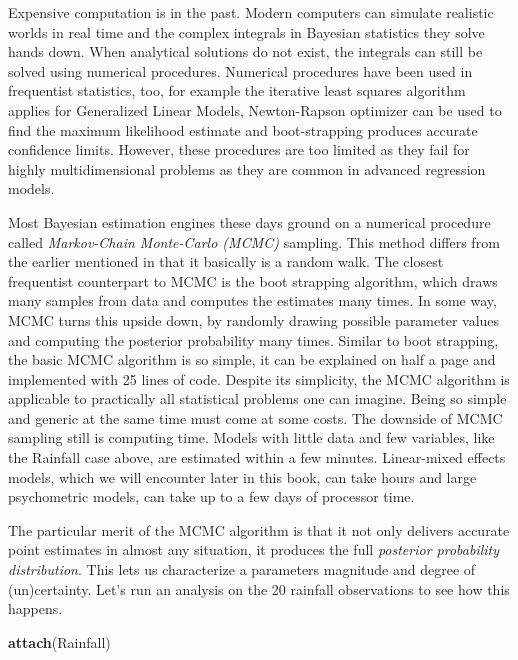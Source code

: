 \documentclass[]{svmono}
\newenvironment{Shaded}{\begin{snugshade}}{\end{snugshade}}
\newcommand{\KeywordTok}[1]{\textcolor[rgb]{0.13,0.29,0.53}{\textbf{#1}}}
\newcommand{\NormalTok}[1]{#1}
\begin{document}
Expensive computation is in the past. Modern computers can simulate
realistic worlds in real time and the complex integrals in Bayesian
statistics they solve hands down. When analytical solutions do not
exist, the integrals can still be solved using numerical procedures.
Numerical procedures have been used in frequentist statistics, too, for
example the iterative least squares algorithm applies for Generalized
Linear Models, Newton-Rapson optimizer can be used to find the maximum
likelihood estimate and boot-strapping produces accurate confidence
limits. However, these procedures are too limited as they fail for
highly multidimensional problems as they are common in advanced
regression models.

Most Bayesian estimation engines these days ground on a numerical
procedure called \emph{Markov-Chain Monte-Carlo (MCMC)} sampling. This
method differs from the earlier mentioned in that it basically is a
random walk. The closest frequentist counterpart to MCMC is the boot
strapping algorithm, which draws many samples from data and computes the
estimates many times. In some way, MCMC turns this upside down, by
randomly drawing possible parameter values and computing the posterior
probability many times. Similar to boot strapping, the basic MCMC
algorithm is so simple, it can be explained on half a page and
implemented with 25 lines of code. Despite its simplicity, the MCMC
algorithm is applicable to practically all statistical problems one can
imagine. Being so simple and generic at the same time must come at some
costs. The downside of MCMC sampling still is computing time. Models
with little data and few variables, like the Rainfall case above, are
estimated within a few minutes. Linear-mixed effects models, which we
will encounter later in this book, can take hours and large psychometric
models, can take up to a few days of processor time.

The particular merit of the MCMC algorithm is that it not only delivers
accurate point estimates in almost any situation, it produces the full
\emph{posterior probability distribution}. This lets us characterize a
parameters magnitude and degree of (un)certainty. Let's run an analysis
on the 20 rainfall observations to see how this happens.

\begin{Shaded}
\begin{Highlighting}[]
\KeywordTok{attach}\NormalTok{(Rainfall)}
\end{Highlighting}
\end{Shaded}
\end{document}
